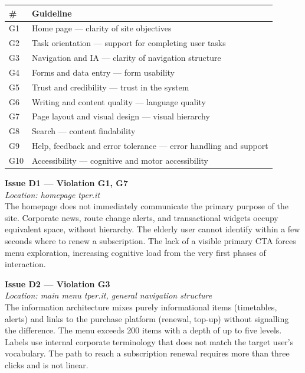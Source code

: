 ﻿\documentclass[11pt,a4paper]{article}
\begin{document}
\begin{tabular}{ll}
\toprule
\textbf{\#} & \textbf{Guideline} \\
\midrule
G1 & Home page --- clarity of site objectives \\
G2 & Task orientation --- support for completing user tasks \\
G3 & Navigation and IA --- clarity of navigation structure \\
G4 & Forms and data entry --- form usability \\
G5 & Trust and credibility --- trust in the system \\
G6 & Writing and content quality --- language quality \\
G7 & Page layout and visual design --- visual hierarchy \\
G8 & Search --- content findability \\
G9 & Help, feedback and error tolerance --- error handling and support \\
G10 & Accessibility --- cognitive and motor accessibility \\
\bottomrule
\end{tabular}

\bigskip

\noindent\textbf{Issue D1 --- Violation G1, G7}\label{iss:D1}\\
\textit{Location: homepage tper.it}\\

\noindent The homepage does not immediately communicate the primary purpose of the
site. Corporate news, route change alerts, and transactional widgets
occupy equivalent space, without hierarchy. The elderly user cannot
identify within a few seconds where to renew a subscription. The lack
of a visible primary CTA forces menu exploration, increasing
cognitive load from the very first phases of interaction.

\bigskip

\noindent\textbf{Issue D2 --- Violation G3}\label{iss:D2}\\
\textit{Location: main menu tper.it, general navigation structure}\\

\noindent The information architecture mixes purely
informational items (timetables, alerts) and links to the purchase platform
(renewal, top-up) without signalling the difference. The menu exceeds 200
items with a depth of up to five levels. Labels use internal
corporate terminology that does not match the target user's vocabulary.
The path to reach a subscription renewal requires more
than three clicks and is not linear.
\end{document}
